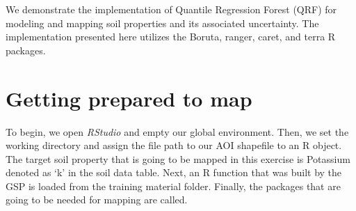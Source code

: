 \documentclass[
  10pt,
  b5paper,
  oneside]{book}
\begin{document}
We demonstrate the implementation of Quantile Regression Forest (QRF) for modeling and mapping soil properties and its associated uncertainty. The implementation presented here utilizes the Boruta, ranger, caret, and terra R packages.

\hypertarget{getting-prepared-to-map}{%
\section{Getting prepared to map}\label{getting-prepared-to-map}}

To begin, we open \emph{RStudio} and empty our global environment. Then, we set the working directory and assign the file path to our AOI shapefile to an R object. The target soil property that is going to be mapped in this exercise is Potassium denoted as `k' in the soil data table. Next, an R function that was built by the GSP is loaded from the training material folder. Finally, the packages that are going to be needed for mapping are called.
\end{document}
